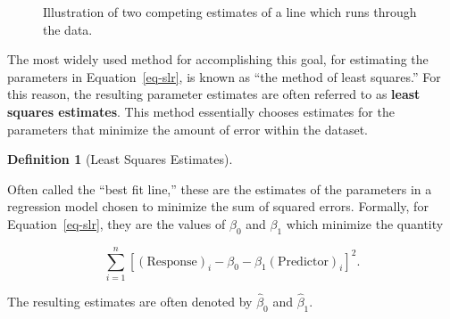 \documentclass[
  letterpaper,
  DIV=11,
  numbers=noendperiod]{scrreprt}
\theoremstyle{definition}
\newtheorem{definition}{Definition}[chapter]
\theoremstyle{definition}
\theoremstyle{plain}
\theoremstyle{remark}
\begin{document}
\begin{figure}


\caption{\label{fig-regmodel-least-squares}Illustration of two competing
estimates of a line which runs through the data.}

\end{figure}%

The most widely used method for accomplishing this goal, for estimating
the parameters in Equation~\ref{eq-slr}, is known as ``the method of
least squares.'' For this reason, the resulting parameter estimates are
often referred to as \textbf{least squares estimates}. This method
essentially chooses estimates for the parameters that minimize the
amount of error within the dataset.

\begin{definition}[Least Squares
Estimates]\protect\hypertarget{def-least-squares-estimates}{}\label{def-least-squares-estimates}

Often called the ``best fit line,'' these are the estimates of the
parameters in a regression model chosen to minimize the sum of squared
errors. Formally, for Equation~\ref{eq-slr}, they are the values of
\(\beta_0\) and \(\beta_1\) which minimize the quantity

\[\sum_{i=1}^n \left[(\text{Response})_i - \beta_0 - \beta_1(\text{Predictor})_{i}\right]^2.\]

The resulting estimates are often denoted by \(\widehat{\beta}_0\) and
\(\widehat{\beta}_1\).

\end{definition}
\end{document}

